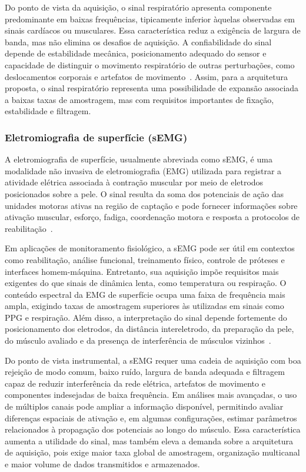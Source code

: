 \documentclass[a4paper,12pt]{fcte}
\begin{document}
Do ponto de vista da aquisição, o sinal respiratório apresenta componente predominante em baixas frequências, tipicamente inferior àquelas observadas em sinais cardíacos ou musculares. Essa característica reduz a exigência de largura de banda, mas não elimina os desafios de aquisição. A confiabilidade do sinal depende de estabilidade mecânica, posicionamento adequado do sensor e capacidade de distinguir o movimento respiratório de outras perturbações, como deslocamentos corporais e artefatos de movimento~\cite{vitazkova2024resp}. Assim, para a arquitetura proposta, o sinal respiratório representa uma possibilidade de expansão associada a baixas taxas de amostragem, mas com requisitos importantes de fixação, estabilidade e filtragem.

\subsubsection{Eletromiografia de superfície (sEMG)}

A eletromiografia de superfície, usualmente abreviada como sEMG, é uma modalidade não invasiva de eletromiografia (EMG) utilizada para registrar a atividade elétrica associada à contração muscular por meio de eletrodos posicionados sobre a pele. O sinal resulta da soma dos potenciais de ação das unidades motoras ativas na região de captação e pode fornecer informações sobre ativação muscular, esforço, fadiga, coordenação motora e resposta a protocolos de reabilitação~\cite{al_ayyad2023emg_rehabilitation,cheng2023flexible_semg}.

Em aplicações de monitoramento fisiológico, a sEMG pode ser útil em contextos como reabilitação, análise funcional, treinamento físico, controle de próteses e interfaces homem-máquina. Entretanto, sua aquisição impõe requisitos mais exigentes do que sinais de dinâmica lenta, como temperatura ou respiração. O conteúdo espectral da EMG de superfície ocupa uma faixa de frequência mais ampla, exigindo taxas de amostragem superiores às utilizadas em sinais como PPG e respiração. Além disso, a interpretação do sinal depende fortemente do posicionamento dos eletrodos, da distância intereletrodo, da preparação da pele, do músculo avaliado e da presença de interferência de músculos vizinhos~\cite{al_ayyad2023emg_rehabilitation,cheng2023flexible_semg}.

Do ponto de vista instrumental, a sEMG requer uma cadeia de aquisição com boa rejeição de modo comum, baixo ruído, largura de banda adequada e filtragem capaz de reduzir interferência da rede elétrica, artefatos de movimento e componentes indesejadas de baixa frequência. Em análises mais avançadas, o uso de múltiplos canais pode ampliar a informação disponível, permitindo avaliar diferenças espaciais de ativação e, em algumas configurações, estimar parâmetros relacionados à propagação dos potenciais ao longo do músculo. Essa característica aumenta a utilidade do sinal, mas também eleva a demanda sobre a arquitetura de aquisição, pois exige maior taxa global de amostragem, organização multicanal e maior volume de dados transmitidos e armazenados.
\end{document}
